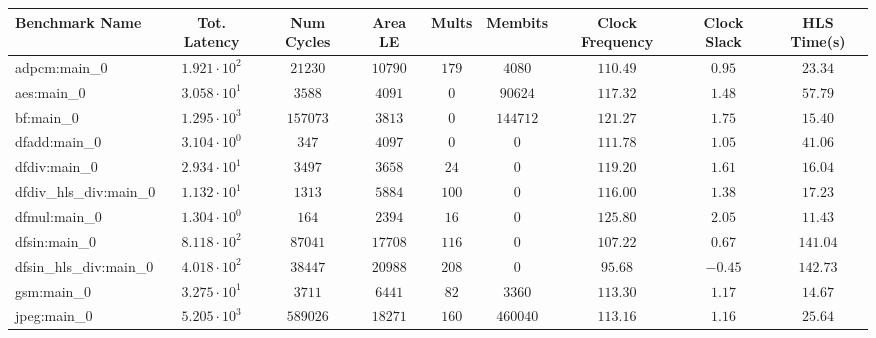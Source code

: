\begin{tabular}{|l|c|c|c|c|c|c|c|c|}
\hline
Benchmark Name          & Tot. Latency           & Num Cycles  & Area LE    & Mults   & Membits    & Clock Frequency & Clock Slack & HLS Time(s) \\
\hline
adpcm:main\_0           & $ 1.921 \cdot 10^{2} $ & $ 21230   $ & $ 10790  $ & $ 179 $ & $ 4080   $ & $ 110.49      $ & $ 0.95    $ & $ 23.34   $ \\
aes:main\_0             & $ 3.058 \cdot 10^{1} $ & $ 3588    $ & $ 4091   $ & $ 0   $ & $ 90624  $ & $ 117.32      $ & $ 1.48    $ & $ 57.79   $ \\
bf:main\_0              & $ 1.295 \cdot 10^{3} $ & $ 157073  $ & $ 3813   $ & $ 0   $ & $ 144712 $ & $ 121.27      $ & $ 1.75    $ & $ 15.40   $ \\
dfadd:main\_0           & $ 3.104 \cdot 10^{0} $ & $ 347     $ & $ 4097   $ & $ 0   $ & $ 0      $ & $ 111.78      $ & $ 1.05    $ & $ 41.06   $ \\
dfdiv:main\_0           & $ 2.934 \cdot 10^{1} $ & $ 3497    $ & $ 3658   $ & $ 24  $ & $ 0      $ & $ 119.20      $ & $ 1.61    $ & $ 16.04   $ \\
dfdiv\_hls\_div:main\_0 & $ 1.132 \cdot 10^{1} $ & $ 1313    $ & $ 5884   $ & $ 100 $ & $ 0      $ & $ 116.00      $ & $ 1.38    $ & $ 17.23   $ \\
dfmul:main\_0           & $ 1.304 \cdot 10^{0} $ & $ 164     $ & $ 2394   $ & $ 16  $ & $ 0      $ & $ 125.80      $ & $ 2.05    $ & $ 11.43   $ \\
dfsin:main\_0           & $ 8.118 \cdot 10^{2} $ & $ 87041   $ & $ 17708  $ & $ 116 $ & $ 0      $ & $ 107.22      $ & $ 0.67    $ & $ 141.04  $ \\
dfsin\_hls\_div:main\_0 & $ 4.018 \cdot 10^{2} $ & $ 38447   $ & $ 20988  $ & $ 208 $ & $ 0      $ & $ 95.68       $ & $ -0.45   $ & $ 142.73  $ \\
gsm:main\_0             & $ 3.275 \cdot 10^{1} $ & $ 3711    $ & $ 6441   $ & $ 82  $ & $ 3360   $ & $ 113.30      $ & $ 1.17    $ & $ 14.67   $ \\
jpeg:main\_0            & $ 5.205 \cdot 10^{3} $ & $ 589026  $ & $ 18271  $ & $ 160 $ & $ 460040 $ & $ 113.16      $ & $ 1.16    $ & $ 25.64   $ \\

\end{tabular}
